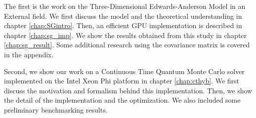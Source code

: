 The first is the work on the Three-Dimensional Edwards-Anderson Model in an External
field. We first discuss the model and the theoretical understanding in chapter 
\ref{chap:SGintro}. Then, an efficient GPU implementation is described in chapter
\ref{chap:sg_imp}. We show the results obtained from this study in chapter \ref{chap:sg_result}.
Some additional research using the covariance matrix is covered in the appendix.

Second, we show our work on a Continuous Time Quantum Monte Carlo solver implemented
on the Intel Xeon Phi platform in chapter \ref{chap:cthyb}. We first discuss the 
motivation and formalism behind this implementation. Then, we show the detail of
the implementation and the optimization. We also included some preliminary benchmarking
results.



